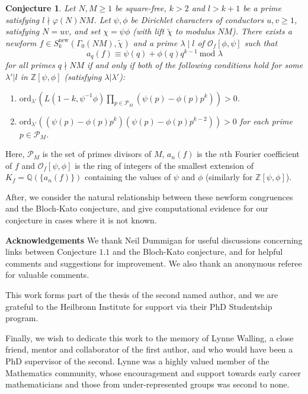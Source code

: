 \documentclass{amsart}
\theoremstyle{plain}
\newtheorem{conj}[theorem]{Conjecture}
\theoremstyle{definition}
\begin{document}
\begin{conj}
Let $N,M\geq 1$ be square-free, $k > 2$ and $l>k+1$ be a prime satisfying $l \nmid \varphi(N)NM$. Let $\psi,\phi$ be Dirichlet characters of conductors $u,v\geq 1$, satisfying $N = uv$, and set $\chi = \psi\phi$ (with lift $\tilde{\chi}$ to modulus $NM$). There exists a newform $f \in S_k^{\text{new}}(\Gamma_0(NM), \tilde{\chi})$ and a prime $\lambda\mid l$ of $\mathcal{O}_f[\phi,\psi]$ such that 
\begin{equation*}
    a_q(f) \equiv \psi(q)+\phi(q)q^{k-1} \ \text{mod } \lambda
\end{equation*}
for all primes $q\nmid NM$ if and only if both of the following conditions hold for some $\lambda'|l$ in $\mathbb{Z}[\psi,\phi]$ (satisfying $\lambda|\lambda'$):
\begin{enumerate}
\item $\text{ord}_{\lambda'}(L(1-k, \psi^{-1}\phi) \prod_{p \in \mathcal{P}_M} (\psi(p) - \phi(p)p^k)) > 0$.
\item $\text{ord}_{\lambda'}((\psi(p)-\phi(p)p^k)(\psi(p)-\phi(p)p^{k-2}))>0$ for each prime $p\in \mathcal{P}_M$.
\end{enumerate}
\end{conj} 

\noindent Here, $\mathcal{P}_M$ is the set of primes divisors of $M$, $a_n(f)$ is the $n$th Fourier coefficient of $f$ and $\mathcal{O}_f[\psi,\phi]$ is the ring of integers of the smallest extension of $K_f = \mathbb{Q}(\{a_n(f)\})$ containing the values of $\psi$ and $\phi$ (similarly for $\mathbb{Z}[\psi,\phi]$).

After, we consider the natural relationship between these newform congruences and the Bloch-Kato conjecture, and give computational evidence for our conjecture in cases where it is not known.

\textbf{Acknowledgements} We thank Neil Dummigan for useful discussions concerning links between Conjecture $1.1$ and the Bloch-Kato conjecture, and for helpful comments and suggestions for improvement. We also thank an anonymous referee for valuable comments.

This work forms part of the thesis of the second named author, and we are grateful to the Heilbronn Institute for support via their PhD Studentship program. 

Finally, we wish to dedicate this work to the memory of Lynne Walling, a close friend, mentor and collaborator of the first author, and who would have been a PhD supervisor of the second. Lynne was a highly valued member of the Mathematics community, whose encouragement and support towards early career mathematicians and those from under-represented groups was second to none.
\end{document}
